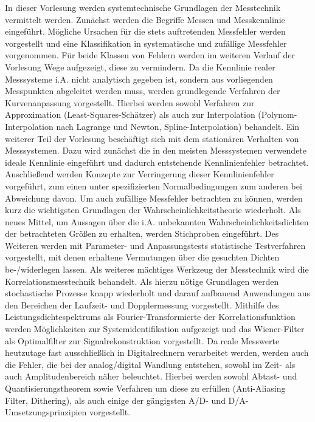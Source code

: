 \begin{course}
\begin{content}
In dieser Vorlesung werden systemtechnische Grundlagen der Messtechnik vermittelt werden.\newline
Zunächst werden die Begriffe Messen und Messkennlinie eingeführt. Mögliche Ursachen für die stets auftretenden Messfehler werden vorgestellt und eine Klassifikation in systematische und zufällige Messfehler vorgenommen. Für beide Klassen von Fehlern werden im weiteren Verlauf der Vorlesung Wege aufgezeigt, diese zu vermindern.\newline
Da die Kennlinie realer Messsysteme i.A. nicht analytisch gegeben ist, sondern aus vorliegenden Messpunkten abgeleitet werden muss, werden grundlegende Verfahren der Kurvenanpassung vorgestellt. Hierbei werden sowohl Verfahren zur Approximation (Least-Squares-Schätzer) als auch zur Interpolation (Polynom-Interpolation nach Lagrange und Newton, Spline-Interpolation) behandelt.\newline
Ein weiterer Teil der Vorlesung beschäftigt sich mit dem stationären Verhalten von Messsystemen. Dazu wird zunächst die in den meisten Messsystemen verwendete ideale Kennlinie eingeführt und dadurch entstehende Kennlinienfehler betrachtet. Anschließend werden Konzepte zur Verringerung dieser Kennlinienfehler vorgeführt, zum einen unter spezifizierten Normalbedingungen zum anderen bei Abweichung davon.\newline
Um auch zufällige Messfehler betrachten zu können, werden kurz die wichtigsten Grundlagen der Wahrscheinlichkeitstheorie wiederholt. Als neues Mittel, um Aussagen über die i.A. unbekannten Wahrscheinlichkeitsdichten der betrachteten Größen zu erhalten, werden Stichproben eingeführt. Des Weiteren werden mit Parameter- und Anpassungstests statistische Testverfahren vorgestellt, mit denen erhaltene Vermutungen über die gesuchten Dichten be-/widerlegen lassen.\newline
Als weiteres mächtiges Werkzeug der Messtechnik wird die Korrelationsmesstechnik behandelt. Als hierzu nötige Grundlagen werden stochastische Prozesse knapp wiederholt und darauf aufbauend Anwendungen aus den Bereichen der Laufzeit- und Dopplermessung vorgestellt. Mithilfe des Leistungsdichtespektrums als Fourier-Transformierte der Korrelationsfunktion werden Möglichkeiten zur Systemidentifikation aufgezeigt und das Wiener-Filter als Optimalfilter zur Signalrekonstruktion vorgestellt.\newline
Da reale Messwerte heutzutage fast ausschließlich in Digitalrechnern verarbeitet werden, werden auch die Fehler, die bei der analog/digital Wandlung entstehen, sowohl im Zeit- als auch Amplitudenbereich näher beleuchtet. Hierbei werden sowohl Abtast- und Quantisierungstheorem sowie Verfahren um diese zu erfüllen (Anti-Aliasing Filter, Dithering), als auch einige der gängigsten A/D- und D/A-Umsetzungsprinzipien vorgestellt.\newline

\end{content}
\end{course}
